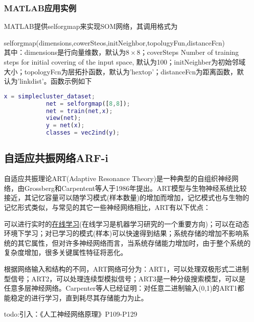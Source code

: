         \subsubsection{MATLAB应用实例}
            \par
            MATLAB提供selforgmap来实现SOM网络，其调用格式为
            \par
            selforgmap(dimensions,cowerSteos,initNeighbor,topolugyFun,distanceFcn)\\
            其中：dimensions是行向量维数，默认为$8\times 8$；coverSteps Number of training steps for initial covering of the input space, 默认为100；initNeighber为初始邻域大小；topologyFcn为层拓扑函数，默认为'hextop'；distanceFcn为距离函数，默认为'linkdist'。函数示例如下
            \begin{lstlisting}[language = Matlab]
            x = simplecluster_dataset;
            net = selforgmap([8,8]);
            net = train(net,x);
            view(net);
            y = net(x);
            classes = vec2ind(y);
            \end{lstlisting}

    \subsection{自适应共振网络ARF-i}
        \par
        自适应共振理论ART(Adaptive Resonance Theory)是一种典型的自组织神经网络，由Grossberg和Carpentent等人于1986年提出。ART模型与生物神经系统比较接近，其记忆容量可以随学习模式(样本数量)的增加而增加，记忆模式也与生物的记忆形式类似，与常见的其它一些神经网络相比，ART有以下优点：
        \par
        可以进行实时的\underline{在线学习}(在线学习是机器学习研究的一个重要方向)；可以在动态环境下学习；对已学习的模式(样本)可以快速得到结果；系统存储的增加不影响系统的其它属性，但对许多神经网络而言，当系统存储能力增加时，由于整个系统的复杂度增加，很多关键属性特征将恶化。
        \par
        根据网络输入和结构的不同，ART网络可分为：ART1，可以处理双极形式二进制型信号；ART2，可以处理连续型模拟信号；ART3是一种分级搜索模型，可以是任意多层神经网络。Carpenter等人已经证明：对任意二进制输入(0,1)的ART1都能稳定的进行学习，直到耗尽其存储能力为止。
        \par
        todo:引入：《人工神经网络原理》P109-P129

